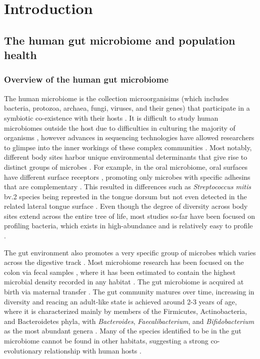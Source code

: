 \chapter{Introduction}

\section{The human gut microbiome and population health}
\subsection{Overview of the human gut microbiome}

The human microbiome is the collection microorganisims (which includes bacteria, protozoa, archaea, fungi, viruses, and their genes) that participate in a symbiotic co-existence with their hosts \cite{ursell2012defining}. It is difficult to study human microbiomes outside the host due to difficulties in culturing the majority of organisms \cite{}, however advances in sequencing technologies have allowed researchers to glimpse into the inner workings of these complex communities \cite{}. Most notably, different body sites harbor unique environmental determinants that give rise to distinct groups of microbes \cite{consortium2012structure}. For example, in the oral microbiome, oral surfaces have different surface receptors \cite{gibbons1989bacterial}, promoting only microbes with specific adhesins that are complementary \cite{aas2005defining}. This resulted in differences such as \emph{Streptococcus mitis} bv.2 species being represted in the tongue dorsum but not even detected in the related lateral tongue surface \cite{aas2005defining}. Even though the degree of diversity across body sites extend across the entire tree of life, most studies so-far have been focused on profiling bacteria, which exists in high-abundance and is relatively easy to profile \cite{}. 

The gut environment also promotes a very specific group of microbes which varies across the digestive track \cite{mailhe2018repertoire, donaldson2016gut}. Most microbiome research has been focused on the colon via fecal samples \cite{tang2020current}, where it has been estimated to contain the highest microbial density recorded in any habitat \cite{}. The gut microbiome is acquired at birth \cite{} via maternal transfer \cite{}. The gut community matures over time, increasing in diversity and reacing an adult-like state is achieved around 2-3 years of age, where it is characterized mainly by members of the Firmicutes, Actinobacteria, and Bacteroidetes phyla, with \emph{Bacteroides}, \emph{Faecalibacterium}, and \emph{Bifidobacterium} as the most abundant genera \cite{king2019baseline, metahitconsortiumadditionalmembers2011enterotypes}. Many of the species identified to be in the gut microbiome cannot be found in other habitats, suggesting a strong co-evolutionary relationship with human hosts \cite{ley2006ecological}.  

